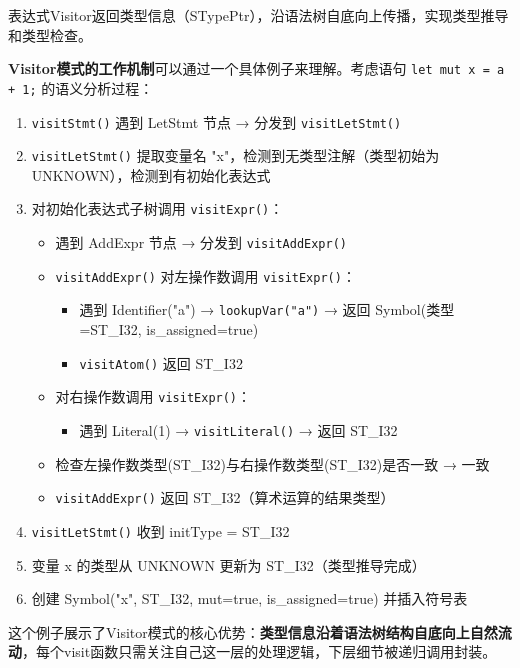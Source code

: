 \documentclass[12pt,a4paper]{ctexart}
\begin{document}
表达式Visitor返回类型信息（STypePtr），沿语法树自底向上传播，实现类型推导和类型检查。

\textbf{Visitor模式的工作机制}可以通过一个具体例子来理解。考虑语句 \texttt{let mut x = a + 1;} 的语义分析过程：

\begin{enumerate}
    \item \texttt{visitStmt()} 遇到 LetStmt 节点 → 分发到 \texttt{visitLetStmt()}
    \item \texttt{visitLetStmt()} 提取变量名 "x"，检测到无类型注解（类型初始为 UNKNOWN），检测到有初始化表达式
    \item 对初始化表达式子树调用 \texttt{visitExpr()}：
        \begin{itemize}
            \item 遇到 AddExpr 节点 → 分发到 \texttt{visitAddExpr()}
            \item \texttt{visitAddExpr()} 对左操作数调用 \texttt{visitExpr()}：
                \begin{itemize}
                    \item 遇到 Identifier("a") → \texttt{lookupVar("a")} → 返回 Symbol(类型=ST\_I32, is\_assigned=true)
                    \item \texttt{visitAtom()} 返回 ST\_I32
                \end{itemize}
            \item 对右操作数调用 \texttt{visitExpr()}：
                \begin{itemize}
                    \item 遇到 Literal(1) → \texttt{visitLiteral()} → 返回 ST\_I32
                \end{itemize}
            \item 检查左操作数类型(ST\_I32)与右操作数类型(ST\_I32)是否一致 → 一致
            \item \texttt{visitAddExpr()} 返回 ST\_I32（算术运算的结果类型）
        \end{itemize}
    \item \texttt{visitLetStmt()} 收到 initType = ST\_I32
    \item 变量 x 的类型从 UNKNOWN 更新为 ST\_I32（类型推导完成）
    \item 创建 Symbol("x", ST\_I32, mut=true, is\_assigned=true) 并插入符号表
\end{enumerate}

这个例子展示了Visitor模式的核心优势：\textbf{类型信息沿着语法树结构自底向上自然流动}，每个visit函数只需关注自己这一层的处理逻辑，下层细节被递归调用封装。
\end{document}
